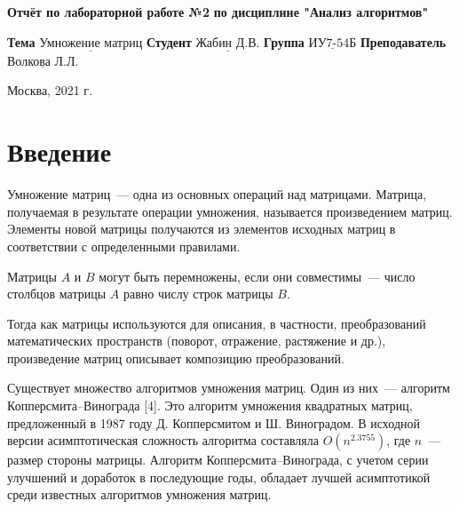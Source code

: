 \documentclass[12pt, a4paper]{report}
\begin{document}
\begin{titlepage}
	
	\begin{center}
		\noindent
			\LARGE\textbf{Отчёт по лабораторной работе №2}\newline
			\textbf{по дисциплине "Анализ алгоритмов"}\newline\newline
	\end{center}
	
	\large\noindent\textbf{Тема} $\underline{\text{Умножение матриц}}$\newline\newline
	\noindent\textbf{Студент} $\underline{\text{Жабин Д.В.}}$\newline\newline
	\noindent\textbf{Группа} $\underline{\text{ИУ7-54Б}}$\newline\newline
	\noindent\textbf{Преподаватель} $\underline{\text{Волкова Л.Л.}}$\newline\newline\newline
	
	\begin{center}
		\large\vfill
		Москва, 2021 г.
	\end{center}
\end{titlepage}

\setlength{\parindent}{1.25cm}

\setcounter{page}{2}\large\linespread{1.3}\tableofcontents

\newpage
\chapter*{Введение}

Умножение матриц~--- одна из основных операций над матрицами. Матрица, получаемая в результате операции умножения, называется произведением матриц. Элементы новой матрицы получаются из элементов исходных матриц в соответствии с определенными правилами.

Матрицы $A$ и $B$ могут быть перемножены, если они совместимы~--- число столбцов матрицы $A$ равно числу строк матрицы $B$.

Тогда как матрицы используются для описания, в частности, преобразований математических пространств (поворот, отражение, растяжение и др.), произведение матриц описывает композицию преобразований.\newline

Существует множество алгоритмов умножения матриц. Один из них~--- алгоритм Копперсмита--Винограда [4]. Это алгоритм умножения квадратных матриц, предложенный в 1987 году Д. Копперсмитом и Ш. Виноградом. В исходной версии асимптотическая сложность алгоритма составляла $O(n^{2.3755})$, где $n$~--- размер стороны матрицы. Алгоритм Копперсмита--Винограда, с учетом серии улучшений и доработок в последующие годы, обладает лучшей асимптотикой среди известных алгоритмов умножения матриц.\newline
\end{document}
